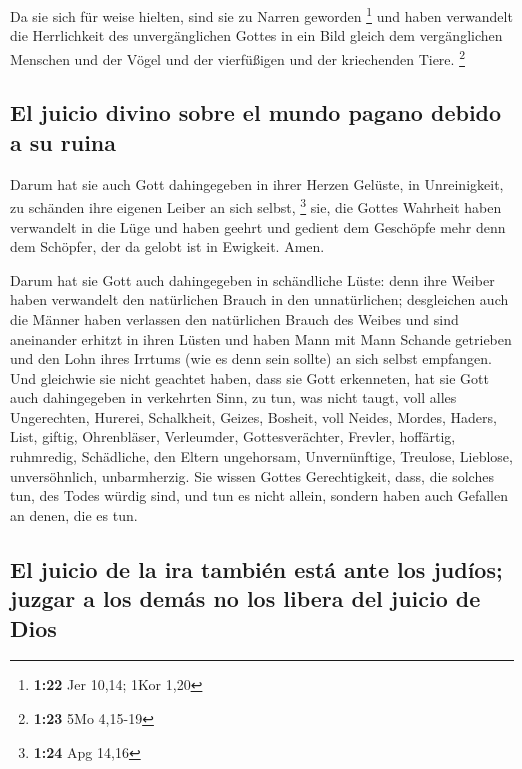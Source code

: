  Da sie sich für weise hielten, sind sie zu Narren
geworden \footnote{\textbf{1:22} Jer 10,14; 1Kor 1,20} 
und haben verwandelt die Herrlichkeit des unvergänglichen Gottes in ein
Bild gleich dem vergänglichen Menschen und der Vögel und der vierfüßigen
und der kriechenden Tiere. \footnote{\textbf{1:23} 5Mo 4,15-19}

\hypertarget{el-juicio-divino-sobre-el-mundo-pagano-debido-a-su-ruina}{%
\subsection{El juicio divino sobre el mundo pagano debido a su
ruina}\label{el-juicio-divino-sobre-el-mundo-pagano-debido-a-su-ruina}}

 Darum hat sie auch Gott dahingegeben in ihrer Herzen
Gelüste, in Unreinigkeit, zu schänden ihre eigenen Leiber an sich
selbst, \footnote{\textbf{1:24} Apg 14,16}  sie, die
Gottes Wahrheit haben verwandelt in die Lüge und haben geehrt und
gedient dem Geschöpfe mehr denn dem Schöpfer, der da gelobt ist in
Ewigkeit. Amen.

 Darum hat sie Gott auch dahingegeben in schändliche
Lüste: denn ihre Weiber haben verwandelt den natürlichen Brauch in den
unnatürlichen;  desgleichen auch die Männer haben
verlassen den natürlichen Brauch des Weibes und sind aneinander erhitzt
in ihren Lüsten und haben Mann mit Mann Schande getrieben und den Lohn
ihres Irrtums (wie es denn sein sollte) an sich selbst empfangen.
 Und gleichwie sie nicht geachtet haben, dass sie Gott
erkenneten, hat sie Gott auch dahingegeben in verkehrten Sinn, zu tun,
was nicht taugt,  voll alles Ungerechten, Hurerei,
Schalkheit, Geizes, Bosheit, voll Neides, Mordes, Haders, List, giftig,
Ohrenbläser,  Verleumder, Gottesverächter, Frevler,
hoffärtig, ruhmredig, Schädliche, den Eltern ungehorsam, 
Unvernünftige, Treulose, Lieblose, unversöhnlich, unbarmherzig.
 Sie wissen Gottes Gerechtigkeit, dass, die solches tun,
des Todes würdig sind, und tun es nicht allein, sondern haben auch
Gefallen an denen, die es tun.

\hypertarget{el-juicio-de-la-ira-tambiuxe9n-estuxe1-ante-los-juduxedos-juzgar-a-los-demuxe1s-no-los-libera-del-juicio-de-dios}{%
\subsection{El juicio de la ira también está ante los judíos; juzgar a
los demás no los libera del juicio de
Dios}\label{el-juicio-de-la-ira-tambiuxe9n-estuxe1-ante-los-juduxedos-juzgar-a-los-demuxe1s-no-los-libera-del-juicio-de-dios}}

